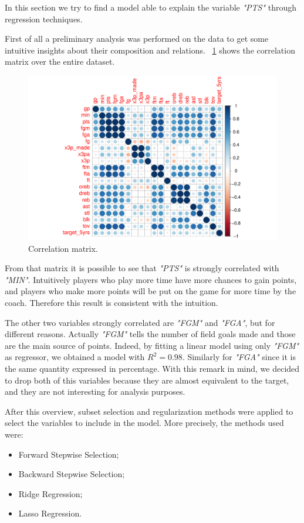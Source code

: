 In this section we try to find a model able to explain the variable \textit{"PTS"} through regression techniques.

First of all a preliminary analysis was performed on the data to get some intuitive insights about their composition and relations.
\Fig~\ref{fig:CorrMatrix} shows the correlation matrix over the entire dataset.
\begin{figure}[h]
	\centering
	\includegraphics[width=0.5\linewidth]{ImageFiles/Regression/CorrMatrix}
	\caption{Correlation matrix.}
	\label{fig:CorrMatrix}
\end{figure}

From that matrix it is possible to see that \textit{"PTS"} is strongly correlated with \textit{"MIN"}. Intuitively players who play more time have more chances to gain points, and players who make more points will be put on the game for more time by the coach. Therefore this result is consistent with the intuition.

The other two variables strongly correlated are \textit{"FGM"} and \textit{"FGA"}, but for different reasons. Actually \textit{"FGM"} tells the number of field goals made and those are the main source of points. Indeed, by fitting a linear model using only \textit{"FGM"} as regressor, we obtained a model with $R^2 = 0.98$. Similarly for \textit{"FGA"} since it is the same quantity expressed in percentage. With this remark in mind, we decided to drop both of this variables because they are almost equivalent to the target, and they are not interesting for analysis purposes.

After this overview, subset selection and regularization methods were applied to select the variables to include in the model. More precisely, the methods used were:
\begin{itemize}
	\item Forward Stepwise Selection;
	\item Backward Stepwise Selection;
	\item Ridge Regression;
	\item Lasso Regression.
\end{itemize}
